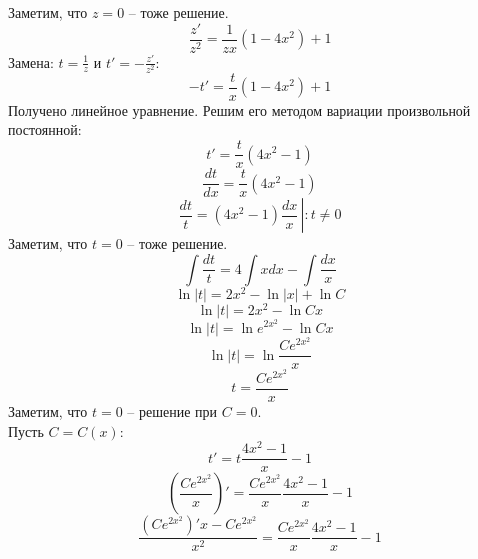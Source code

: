 \documentclass[a5paper, 10pt]{article}
\theoremstyle{definition}
\theoremstyle{plain}
\theoremstyle{remark}
\begin{document}
Заметим, что $z = 0$ -- тоже решение.
\begin{equation*}
 \frac{z'}{ z^2}  =  \frac{1}{zx}(1 - 4x^2) + 1 
\end{equation*} 
Замена: $t = \frac{1}{z}$ и $t' = - \frac{z'}{z^2}$:
\begin{equation*}
-t'  =  \frac{t}{x}(1 - 4x^2) + 1 
\end{equation*} 
Получено линейное уравнение. Решим его методом вариации произвольной постоянной:
\begin{equation*}
t'  =  \frac{t}{x}( 4x^2 - 1) 
\end{equation*} 
\begin{equation*}
 \frac{dt}{dx}  =  \frac{t}{x}( 4x^2 - 1) 
\end{equation*} 
\begin{equation*}
 \frac{dt}{t}  = ( 4x^2 - 1) \frac{dx}{x} \, \left| \right. :  t \neq 0 
\end{equation*} 
Заметим, что $t = 0$ -- тоже решение.
\begin{equation*}
 \int \frac{dt}{t}  =  4 \int x dx -  \int \frac{dx}{x} 
\end{equation*} 
\begin{equation*} 
 \ln |t|  =  2 x^2  -  \ln |x| + \ln C
\end{equation*} 
\begin{equation*} 
 \ln |t|  =  2 x^2  -  \ln Cx
\end{equation*} 
\begin{equation*} 
 \ln |t|  = \ln e^{ 2 x^2 } -  \ln Cx
\end{equation*} 
\begin{equation*} 
 \ln |t|  = \ln \frac{C e^{ 2 x^2 }}{x}
\end{equation*} 
\begin{equation*} 
 t =  \frac{C e^{ 2 x^2 }}{x}
\end{equation*} 
Заметим, что $t = 0$ -- решение при $C = 0$.\\
Пусть $C = C(x)$:
\begin{equation*}
t'  = t \frac{4x^2 - 1}{x} - 1 
\end{equation*} 
\begin{equation*}
\left(  \frac{C e^{ 2 x^2 }}{x} \right)'  =  \frac{C e^{ 2 x^2 }}{x} \frac{4x^2 - 1}{x} - 1 
\end{equation*}
\begin{equation*}
  \frac{(C e^{ 2 x^2 })' x - C e^{ 2 x^2 }}{x^2}   =  \frac{C e^{ 2 x^2 }}{x} \frac{4x^2 - 1}{x} - 1 
\end{equation*}
\end{document}
